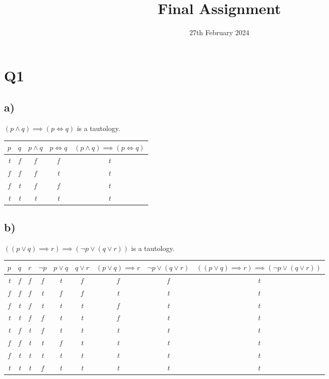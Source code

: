 \documentclass{article}
\title{Final Assignment}
\date{\vspace{-1.0cm}27th February 2024}
\begin{document}
\maketitle

\section*{Q1}

\subsection*{\small a)}
$(p \land q) \implies (p \iff q)$ is a tautology.

\begin{table}[h!]
\begin{tabular}{|c c c c c|} 
\hline 
$p$ & $q$ & $p \land q$ & $p \iff q$ & $(p \land q) \implies (p \iff q)$ \\
\hline
\em{t} & \em{f} & \em{f} & \em{f} & \em{t}  \\ 
\em{f} & \em{f} & \em{f} & \em{t} & \em{t}  \\
\em{f} & \em{t} & \em{f} & \em{f} & \em{t}  \\
\em{t} & \em{t} & \em{t} & \em{t} & \em{t}  \\
\hline
\end{tabular}
\end{table}

\subsection*{\small b)}
$((p \lor q) \implies r) \implies ( \lnot p \lor ( q \lor r ))$ is a tautology.

\begin{table}[h!]
\begin{tabular}{|c c c c c c c c c|} 
\hline 
$p$ & $q$ & $r$ & $\lnot p$ & $p \lor q$ & $q \lor r$ & $(p \lor q) \implies r$ & $\lnot p \lor (q \lor r)$ & $((p \lor q) \implies r) \implies (\lnot p \lor (q \lor r))$ \\
\hline
\em{t} & \em{f} & \em{f} & \em{f} & \em{t} & \em{f} & \em{f} & \em{f} & \em{t}  \\ 
\em{f} & \em{f} & \em{f} & \em{t} & \em{f} & \em{f} & \em{t} & \em{t} & \em{t}  \\
\em{f} & \em{t} & \em{f} & \em{t} & \em{t} & \em{t} & \em{f} & \em{t} & \em{t}  \\
\em{t} & \em{t} & \em{f} & \em{f} & \em{t} & \em{t} & \em{f} & \em{t} & \em{t}  \\
\em{t} & \em{f} & \em{t} & \em{f} & \em{t} & \em{t} & \em{t} & \em{t} & \em{t}  \\ 
\em{f} & \em{f} & \em{t} & \em{t} & \em{f} & \em{t} & \em{t} & \em{t} & \em{t}  \\
\em{f} & \em{t} & \em{t} & \em{t} & \em{t} & \em{t} & \em{t} & \em{t} & \em{t}  \\
\em{t} & \em{t} & \em{t} & \em{f} & \em{t} & \em{t} & \em{t} & \em{t} & \em{t}  \\
\hline
\end{tabular}
\end{table}
\end{document}
